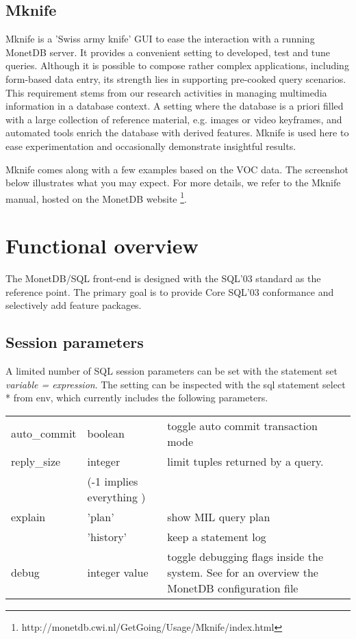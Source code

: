\documentclass[10pt,twocolumn,fleqn]{article}
\begin{document}
\subsection{Mknife}
\label{mknife}
Mknife is a 'Swiss army knife' GUI to ease the interaction with a running 
MonetDB server. It provides a convenient setting to developed, test and 
tune queries. Although it is possible to compose rather complex applications,
including form-based data entry, its strength lies in supporting pre-cooked 
query scenarios. This requirement stems from our research activities in managing 
multimedia information in a database context. A setting where the database 
is a priori filled with a large collection of reference material, 
e.g. images or video keyframes, and automated tools enrich the database 
with derived features. Mknife is used here to ease experimentation and 
occasionally demonstrate insightful results.

Mknife comes along with a few examples based on the VOC
data. The screenshot below illustrates what you may expect.
For more details, we refer to the Mknife manual, hosted on
the
MonetDB website \footnote{http://monetdb.cwi.nl/GetGoing/Usage/Mknife/index.html}.


\section{Functional overview}
\label{Functionality}
The MonetDB/SQL front-end is designed with the SQL'03 standard as the reference
point. The primary goal is to provide Core SQL'03 conformance and
selectively add feature packages.

\subsection*{Session parameters}
A limited number of SQL session parameters can be set with the
statement {\sc set} {\em variable = expression}.
The setting can be inspected with the {\sc sql} statement
{\sc select} * {\sc from} env, which currently includes
the following parameters.
\begin{tabular}{ll l}
auto\_commit & boolean & toggle auto commit transaction mode\\
reply\_size & integer & limit tuples returned by a query.\\
	& (-1 implies everything )\\
explain & 'plan' & show MIL query plan\\
	& 'history' & keep a statement log \\
debug & integer value & toggle debugging flags inside the system. 
See for an overview the MonetDB configuration file\\
\end{tabular}
\end{document}
